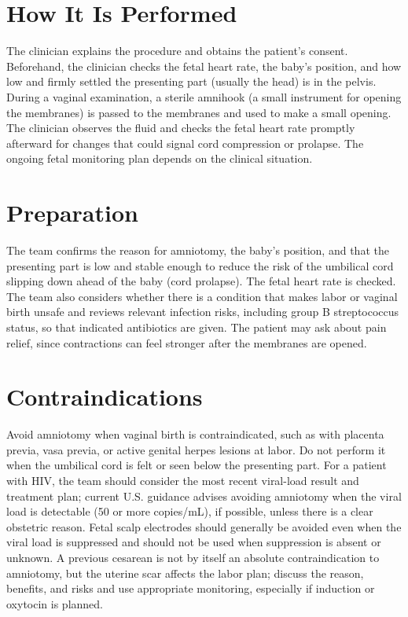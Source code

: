 \section*{How It Is Performed}
The clinician explains the procedure and obtains the patient's consent. Beforehand, the clinician checks the fetal heart rate, the baby's position, and how low and firmly settled the presenting part (usually the head) is in the pelvis. During a vaginal examination, a sterile amnihook (a small instrument for opening the membranes) is passed to the membranes and used to make a small opening. The clinician observes the fluid and checks the fetal heart rate promptly afterward for changes that could signal cord compression or prolapse. The ongoing fetal monitoring plan depends on the clinical situation.

\section*{Preparation}
The team confirms the reason for amniotomy, the baby's position, and that the presenting part is low and stable enough to reduce the risk of the umbilical cord slipping down ahead of the baby (cord prolapse). The fetal heart rate is checked. The team also considers whether there is a condition that makes labor or vaginal birth unsafe and reviews relevant infection risks, including group B streptococcus status, so that indicated antibiotics are given. The patient may ask about pain relief, since contractions can feel stronger after the membranes are opened.

\section*{Contraindications}
Avoid amniotomy when vaginal birth is contraindicated, such as with placenta previa, vasa previa, or active genital herpes lesions at labor. Do not perform it when the umbilical cord is felt or seen below the presenting part. For a patient with HIV, the team should consider the most recent viral-load result and treatment plan; current U.S. guidance advises avoiding amniotomy when the viral load is detectable (50 or more copies/mL), if possible, unless there is a clear obstetric reason. Fetal scalp electrodes should generally be avoided even when the viral load is suppressed and should not be used when suppression is absent or unknown. A previous cesarean is not by itself an absolute contraindication to amniotomy, but the uterine scar affects the labor plan; discuss the reason, benefits, and risks and use appropriate monitoring, especially if induction or oxytocin is planned.

